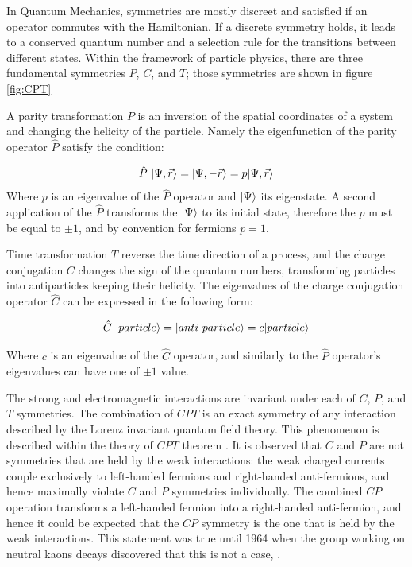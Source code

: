 In Quantum Mechanics, symmetries are mostly discreet and satisfied if an operator commutes with the Hamiltonian. If a discrete symmetry holds, it leads to a conserved quantum number and a selection rule for the transitions between different states. 
Within the framework of particle physics, there are three fundamental symmetries $P$, $C$, and $T$; those symmetries are shown in figure \ref{fig:CPT}

A parity transformation $P$ is an inversion of the spatial coordinates of a system and changing the helicity of the particle. Namely the eigenfunction of the parity operator $  \hat{P}$ satisfy the condition: 

\begin{equation}
    \hat{P}~ \lvert\Psi, \vec{r}\rangle = \lvert\Psi, - \vec{r}\rangle = p \lvert\Psi, \vec{r}\rangle  
\end{equation}
Where $p$ is an eigenvalue of the $ \hat{P}$ operator and $\lvert\Psi\rangle$ its eigenstate. A second application of the $\hat{P}$ transforms the $\lvert\Psi\rangle$ to its initial state, therefore the $p$ must be equal to $\pm 1$, and by convention for fermions $p=1$.  


Time transformation $T$ reverse the time direction of a process, and the charge conjugation $C$ changes the sign of the quantum numbers, transforming particles into antiparticles keeping their helicity. The eigenvalues of the  charge conjugation operator $\hat{C}$ can be expressed in the following form:
 

\begin{equation}
    \hat{C}~ \lvert particle\rangle = \lvert anti~ particle\rangle = c \lvert particle\rangle  
\end{equation}

Where $c$ is an eigenvalue of the $ \hat{C}$ operator, and similarly to the $\hat{P}$ operator’s eigenvalues can have one of $\pm 1$ value.   

The strong and electromagnetic interactions are invariant under each of $C$, $P$, and $T$ symmetries.  The combination of $CPT$ is an exact symmetry of any interaction described by the Lorenz invariant quantum field theory. This phenomenon is described within the theory of  $CPT$ theorem \cite{CPT_theorm}.
It is observed that $C$ and $P$ are not symmetries that are held by the weak interactions: the weak charged currents couple exclusively to left-handed fermions and right-handed anti-fermions, and hence maximally violate $C$ and $P$ symmetries individually. The combined $CP$ operation transforms a left-handed fermion into a right-handed anti-fermion, and hence it could be expected that the $CP$ symmetry is the one that is held by the weak interactions. This statement was true until 1964 when the group working on neutral kaons decays discovered that this is not a case, \cite{CPV_kaons}. 


